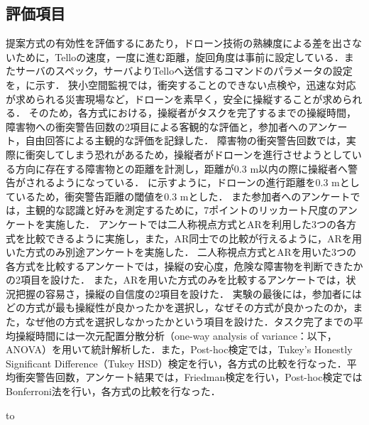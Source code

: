 \documentclass[submit, sigrecommended]{ipsj}
\begin{document}
\subsection{評価項目}
提案方式の有効性を評価するにあたり，ドローン技術の熟練度による差を出さないために，Telloの速度，一度に進む距離，旋回角度は事前に設定している．またサーバのスペック，サーバよりTelloへ送信するコマンドのパラメータの設定を，に示す．
狭小空間監視では，衝突することのできない点検や，迅速な対応が求められる災害現場など，ドローンを素早く，安全に操縦することが求められる．
そのため，各方式における，操縦者がタスクを完了するまでの操縦時間，障害物への衝突警告回数の2項目による客観的な評価と，参加者へのアンケート，自由回答による主観的な評価を記録した．
障害物の衝突警告回数では，実際に衝突してしまう恐れがあるため，操縦者がドローンを進行させようとしている方向に存在する障害物との距離を計測し，距離が0.3 m以内の際に操縦者へ警告がされるようになっている．
に示すように，ドローンの進行距離を0.3 mとしているため，衝突警告距離の閾値を0.3 mとした．
また参加者へのアンケートでは，主観的な認識と好みを測定するために，7ポイントのリッカート尺度のアンケートを実施した．
アンケートでは二人称視点方式とARを利用した3つの各方式を比較できるように実施し，また，AR同士での比較が行えるように，ARを用いた方式のみ別途アンケートを実施した．
二人称視点方式とARを用いた3つの各方式を比較するアンケートでは，操縦の安心度，危険な障害物を判断できたかの2項目を設けた．
また，ARを用いた方式のみを比較するアンケートでは，状況把握の容易さ，操縦の自信度の2項目を設けた．
実験の最後には，参加者にはどの方式が最も操縦性が良かったかを選択し，なぜその方式が良かったのか，また，なぜ他の方式を選択しなかったかという項目を設けた．タスク完了までの平均操縦時間には一次元配置分散分析（one-way analysis of variance：以下，ANOVA）を用いて統計解析した．また，Post-hoc検定では，Tukey’s Honestly Significant Difference（Tukey HSD）検定を行い，各方式の比較を行なった．平均衝突警告回数，アンケート結果では，Friedman検定を行い，Post-hoc検定ではBonferroni法を行い，各方式の比較を行なった．



\begin{table}[tb] 
  \caption{サーバの性能} 
  \label{tab:server_spec}
  \hbox to
\end{table}
\end{document}
